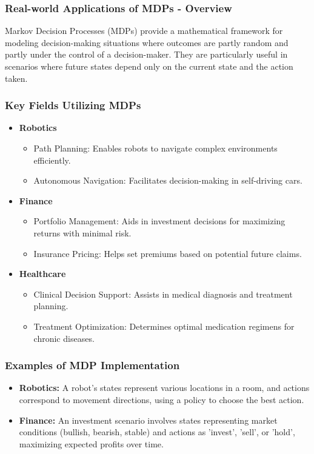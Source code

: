 \documentclass[aspectratio=169]{beamer}
\begin{document}
\begin{frame}[fragile]
    \frametitle{Real-world Applications of MDPs - Overview}
    Markov Decision Processes (MDPs) provide a mathematical framework for modeling decision-making situations where outcomes are partly random and partly under the control of a decision-maker. They are particularly useful in scenarios where future states depend only on the current state and the action taken.
\end{frame}

\begin{frame}[fragile]
    \frametitle{Key Fields Utilizing MDPs}
    \begin{itemize}
        \item \textbf{Robotics}
        \begin{itemize}
            \item Path Planning: Enables robots to navigate complex environments efficiently.
            \item Autonomous Navigation: Facilitates decision-making in self-driving cars.
        \end{itemize}
        
        \item \textbf{Finance}
        \begin{itemize}
            \item Portfolio Management: Aids in investment decisions for maximizing returns with minimal risk.
            \item Insurance Pricing: Helps set premiums based on potential future claims.
        \end{itemize}
        
        \item \textbf{Healthcare}
        \begin{itemize}
            \item Clinical Decision Support: Assists in medical diagnosis and treatment planning.
            \item Treatment Optimization: Determines optimal medication regimens for chronic diseases.
        \end{itemize}
    \end{itemize}
\end{frame}

\begin{frame}[fragile]
    \frametitle{Examples of MDP Implementation}
    \begin{itemize}
        \item \textbf{Robotics:} A robot's states represent various locations in a room, and actions correspond to movement directions, using a policy to choose the best action.
        
        \item \textbf{Finance:} An investment scenario involves states representing market conditions (bullish, bearish, stable) and actions as 'invest', 'sell', or 'hold', maximizing expected profits over time.
    \end{itemize}
\end{frame}
\end{document}
